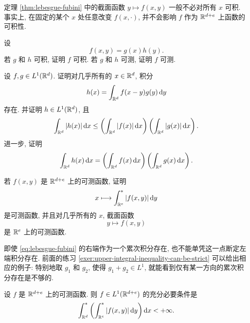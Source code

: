 \begin{rem}
	定理 \ref{thm:lebesgue-fubini} 中的截面函数 \(y\mapsto f(x,y)\) 一般不必对所有 \(x\) 可积. 事实上, 在固定的某个 \(x\) 处任意改变 \(f(x,\cdot)\), 并不会影响 \(f\) 作为 \(\mathbb{R}^{d+e}\) 上函数的可积性.
\end{rem}

\begin{exer}\label{exer:product-measurable-integrable}
	设
	\[
	f(x,y)=g(x)h(y).
	\]
	若 \(g\) 和 \(h\) 可积, 证明 \(f\) 可积. 若 \(g\) 和 \(h\) 可测, 证明 \(f\) 可测.
\end{exer}

\begin{exer}\label{exer:convolution-l1}
	设 \(f,g\in L^1(\mathbb{R}^d)\). 证明对几乎所有的 \(x\in\mathbb{R}^d\), 积分
	\[
	h(x)=\int_{\mathbb{R}^d}f(x-y)g(y)\,\dd y
	\]
	存在. 并证明 \(h\in L^1(\mathbb{R}^d)\), 且
	\[
	\int_{\mathbb{R}^d}|h(x)|\,\dd x
	\leq
	\left(\int_{\mathbb{R}^d}|f(x)|\,\dd x\right)
	\left(\int_{\mathbb{R}^d}|g(x)|\,\dd x\right).
	\]
	进一步, 证明
	\[
	\int_{\mathbb{R}^d}h(x)\,\dd x
	=
	\left(\int_{\mathbb{R}^d}f(x)\,\dd x\right)
	\left(\int_{\mathbb{R}^d}g(x)\,\dd x\right).
	\]
\end{exer}

\begin{exer}\label{exer:sections-of-measurable-functions}
	若 \(f(x,y)\) 是 \(\mathbb{R}^{d+e}\) 上的可测函数, 证明
	\[
	x\longmapsto \int_{\mathbb{R}^e}^{*}|f(x,y)|\,\dd y
	\]
	是可测函数, 并且对几乎所有的 \(x\), 截面函数
	\[
	y\longmapsto f(x,y)
	\]
	是 \(\mathbb{R}^e\) 上的可测函数.
\end{exer}

\begin{rem}
	即使 \eqref{eq:lebesgue-fubini} 的右端作为一个累次积分存在, 也不能单凭这一点断定左端积分存在. 前面的练习 \ref{exer:upper-integral-inequality-can-be-strict} 可以给出相应的例子: 特别地取 \(g_1\) 和 \(g_2\), 使得 \(g_1+g_2\in L^1\), 就能看到仅有某一方向的累次积分存在是不够的.
\end{rem}

\begin{thm}\label{thm:fubini-integrability-criterion}
	设 \(f\) 是 \(\mathbb{R}^{d+e}\) 上的可测函数. 则 \(f\in L^1(\mathbb{R}^{d+e})\) 的充分必要条件是
	\begin{equation}
		\int_{\mathbb{R}^d}^{*}\left(
		\int_{\mathbb{R}^e}^{*}|f(x,y)|\,\dd y
		\right)\dd x<+\infty.
		\label{eq:fubini-integrability-criterion}
	\end{equation}
\end{thm}

